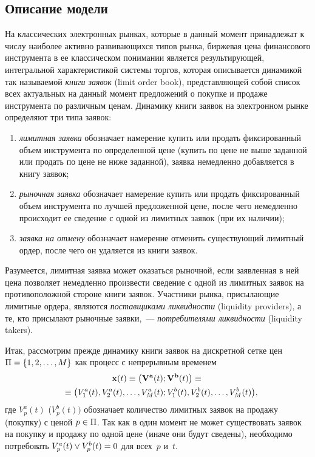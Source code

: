 \begin{multicols}{2}
\section{Описание модели}

На классических электронных рынках, которые в данный момент
принадлежат к числу наиболее активно развивающихся типов рынка,
биржевая цена финансового инструмента в ее классическом понимании
является результирующей, интегральной характеристикой системы
торгов, которая описывается динамикой так называемой {\it книги
заявок} (limit order book), представляющей собой список всех
актуальных на данный момент предложений о покупке и продаже
инструмента по различным ценам. Динамику книги заявок на электронном
рынке определяют три типа заявок:
\begin{enumerate}[(1)]
\item {\it лимитная заявка} обозначает намерение купить или продать
фиксированный объем инструмента по определенной цене (купить по цене
не выше заданной или продать по цене не ниже заданной), заявка немедленно
добавляется в книгу заявок;
\item {\it рыночная заявка} обозначает намерение купить или продать
фиксированный объем инструмента по лучшей предложенной цене, после
чего немедленно происходит ее сведение с одной из лимитных заявок
(при их наличии);
\item {\it заявка на отмену} обозначает намерение отменить существующий
лимитный ордер, после чего он удаляется из книги заявок.
\end{enumerate}

Разумеется, лимитная заявка может оказаться рыночной, если
заявленная в ней цена позволяет немедленно произвести сведение с
одной из лимитных заявок на противоположной стороне книги заявок.
Участники рынка, присылающие лимитные ордера, являются {\it
поставщиками ликвидности} (liquidity providers), а те, кто присылают
рыночные заявки,~--- {\it потребителями ликвидности} (liquidity
takers).

Итак, рассмотрим прежде динамику книги заявок на дискретной сетке цен $\Pi \hm= \{
1, 2, \ldots, M \}$ как процесс с непрерывным временем
\begin{multline*}
\mathbf{x}(t) \equiv \left(\mathbf{V^a}(t); \mathbf{V^b}(t)\right) \equiv{}\\
\hspace*{-3pt}{}\equiv
\left(V^a_1(t), V^a_2(t), \ldots , V^a_M(t); V^b_1(t), V^b_2(t), \ldots ,
V^b_M(t)\right)\!,\hspace*{-8.22688pt}
\end{multline*}
где $V^a_p(t)$ ($V^b_p(t))$ обозначает количество лимитных заявок на
продажу (покупку) с ценой $p \hm\in \Pi$. Так как в один момент не
может существовать заявок на покупку и продажу по одной цене (иначе
они будут сведены), необходимо потребовать $V^a_p(t) \vee V^b_p(t)\hm =
0$ для всех~$p$ и~$t$.


\end{multicols}
